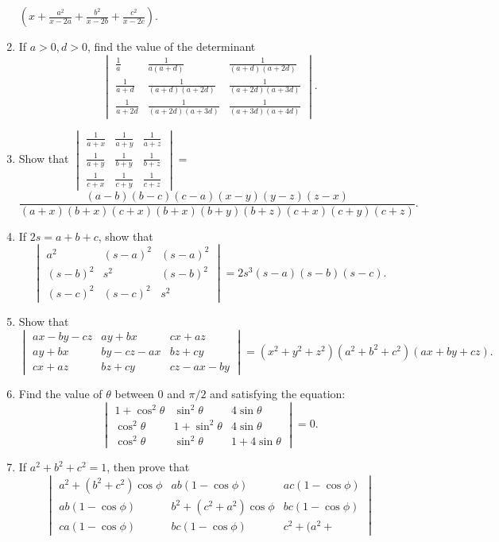 \begin{enumerate}[resume]
  $\left(x + \frac{a^2}{x - 2a} + \frac{b^2}{x - 2b} + \frac{c^2}{x - 2c}\right)$.
\item If $a > 0, d > 0$, find the value of the determinant
  $$\begin{vmatrix}\frac{1}{a} & \frac{1}{a(a + d)} & \frac{1}{(a + d)(a +
    2d)}\\\frac{1}{a + d} & \frac{1}{(a + d)(a + 2d)} & \frac{1}{(a + 2d)(a + 3d)}\\\frac{1}{a + 2d} & \frac{1}{(a + 2d)(a + 3d)}
  & \frac{1}{(a + 3d)(a + 4d)}\end{vmatrix}.$$
\item Show that $\begin{vmatrix}\frac{1}{a + x} & \frac{1}{a + y} & \frac{1}{a + z}\\\frac{1}{a + y} & \frac{1}{b + y} &
  \frac{1}{b + z}\\\frac{1}{c + x} & \frac{1}{c + y} & \frac{1}{c + z}\end{vmatrix} = $ $$\frac{(a - b)(b - c)(c - a)(x - y)(y -
  z)(z - x)}{(a + x)(b + x)(c + x)(b + x)(b + y)(b + z)(c + x)(c + y)(c + z)}.$$
\item If $2s = a + b + c$, show that $$\begin{vmatrix}a^2 & (s - a)^2 & (s - a)^2\\(s - b)^2 & s^2 & (s - b)^2\\(s - c)^2 & (s -
  c)^2 & s^2\end{vmatrix} = 2s^3(s - a)(s - b)(s - c).$$
\item Show that $$\begin{vmatrix}ax - by - cz & ay + bx & cx + az\\ay + bx & by - cz - ax & bz + cy\\cx + az & bz + cy & cz - ax -
  by\end{vmatrix} = (x^2 + y^2 + z^2)(a^2 + b^2 + c^2)(ax + by + cz).$$
\item Find the value of $\theta$ between $0$ and $\pi/2$ and satisfying the equation: $$\begin{vmatrix}1 + \cos^2\theta &
  \sin^2\theta & 4\sin\theta\\\cos^2\theta & 1 + \sin^2\theta & 4\sin\theta\\\cos^2\theta & \sin^2\theta & 1 +
  4\sin\theta\end{vmatrix} = 0.$$
\item If $a^2 + b^2 + c^2 = 1$, then prove that $$\begin{vmatrix}a^2 + (b^2 + c^2)\cos\phi & ab(1 - \cos\phi) & ac(1 -
  \cos\phi)\\ab(1 - \cos\phi) & b^2 + (c^2 + a^2)\cos\phi & bc(1 - \cos\phi)\\ca(1 - \cos\phi) & bc(1 - \cos\phi) & c^2 + (a^2 +

\end{vmatrix}$$
\end{enumerate}
